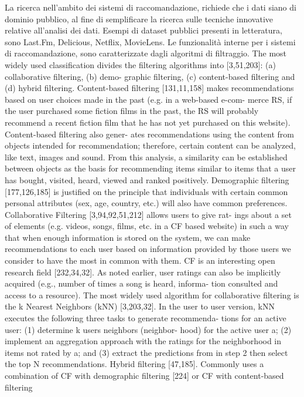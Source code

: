 \documentclass[11pt]{article}
\begin{document}
La ricerca nell'ambito dei sistemi di raccomandazione, richiede che i dati siano di dominio pubblico, al fine di semplificare la ricerca sulle tecniche innovative relative all'analisi dei dati. Esempi di dataset pubblici presenti in letteratura, sono Last.Fm, Delicious, Netflix, MovieLens.
Le funzionalità interne per i sistemi di raccomandazione, sono caratterizzate dagli algoritmi di filtraggio. The most widely used classification divides the filtering
algorithms into [3,51,203]: (a) collaborative filtering, (b) demo-
graphic filtering, (c) content-based filtering and (d) hybrid filtering. Content-based filtering [131,11,158] makes recommendations
based on user choices made in the past (e.g. in a web-based e-com-
merce RS, if the user purchased some fiction films in the past, the
RS will probably recommend a recent fiction film that he has not
yet purchased on this website). Content-based filtering also gener-
ates recommendations using the content from objects intended for
recommendation; therefore, certain content can be analyzed, like
text, images and sound. From this analysis, a similarity can be
established between objects as the basis for recommending items
similar to items that a user has bought, visited, heard, viewed
and ranked positively.
Demographic filtering [177,126,185] is justified on the principle
that individuals with certain common personal attributes (sex,
age, country, etc.) will also have common preferences.
Collaborative Filtering [3,94,92,51,212] allows users to give rat-
ings about a set of elements (e.g. videos, songs, films, etc. in a CF
based website) in such a way that when enough information is
stored on the system, we can make recommendations to each user
based on information provided by those users we consider to have
the most in common with them. CF is an interesting open research
field [232,34,32]. As noted earlier, user ratings can also be implicitly acquired (e.g., number of times a song is heard, informa-
tion consulted and access to a resource).
The most widely used algorithm for collaborative filtering is the
k Nearest Neighbors (kNN) [3,203,32]. In the user to user version,
kNN executes the following three tasks to generate recommenda-
tions for an active user: (1) determine k users neighbors (neighbor-
hood) for the active user a; (2) implement an aggregation approach
with the ratings for the neighborhood in items not rated by a; and
(3) extract the predictions from in step 2 then select the top N
recommendations.
Hybrid filtering [47,185]. Commonly uses a combination of CF
with demographic filtering [224] or CF with content-based filtering
\end{document}
